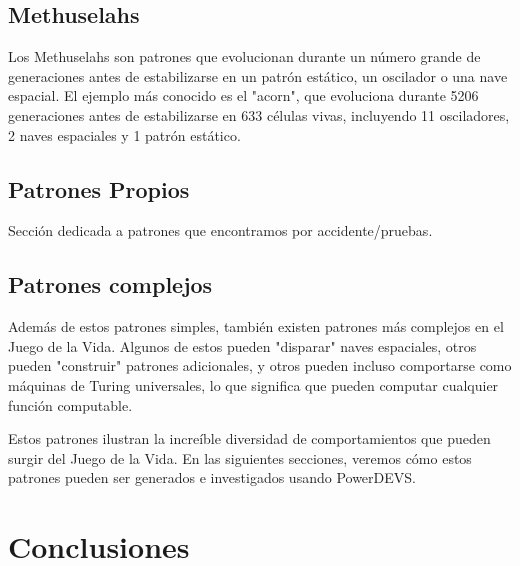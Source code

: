 \documentclass[]{article}
\begin{document}
\subsection{Methuselahs}
Los Methuselahs son patrones que evolucionan durante un número grande de generaciones antes de estabilizarse en un patrón estático, un oscilador o una nave espacial. El ejemplo más conocido es el "acorn", que evoluciona durante 5206 generaciones antes de estabilizarse en 633 células vivas, incluyendo 11 osciladores, 2 naves espaciales y 1 patrón estático.


\subsection{Patrones Propios}
Sección dedicada a patrones que encontramos por accidente/pruebas.

\subsection{Patrones complejos}
Además de estos patrones simples, también existen patrones más complejos en el Juego de la Vida. Algunos de estos pueden "disparar" naves espaciales, otros pueden "construir" patrones adicionales, y otros pueden incluso comportarse como máquinas de Turing universales, lo que significa que pueden computar cualquier función computable.


Estos patrones ilustran la increíble diversidad de comportamientos que pueden surgir del Juego de la Vida. En las siguientes secciones, veremos cómo estos patrones pueden ser generados e investigados usando PowerDEVS.



\section{Conclusiones}
\end{document}
